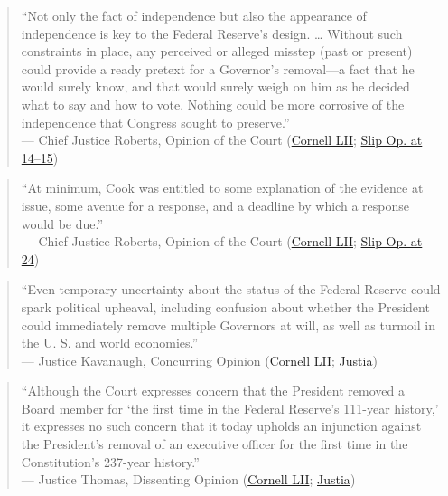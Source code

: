 \documentclass[12pt]{article}
\begin{document}
\begin{quote}
``Not only the fact of independence but also the appearance of independence is key to the Federal Reserve's design. \ldots{} Without such constraints in place, any perceived or alleged misstep (past or present) could provide a ready pretext for a Governor's removal---a fact that he would surely know, and that would surely weigh on him as he decided what to say and how to vote. Nothing could be more corrosive of the independence that Congress sought to preserve.'' \\
--- Chief Justice Roberts, Opinion of the Court (\href{https://www.law.cornell.edu/supremecourt/text/25A312}{Cornell LII}; \href{https://www.supremecourt.gov/opinions/25pdf/25a312_5468.pdf}{Slip Op. at 14--15})
\end{quote}

\begin{quote}
``At minimum, Cook was entitled to some explanation of the evidence at issue, some avenue for a response, and a deadline by which a response would be due.'' \\
--- Chief Justice Roberts, Opinion of the Court (\href{https://www.law.cornell.edu/supremecourt/text/25A312}{Cornell LII}; \href{https://www.supremecourt.gov/opinions/25pdf/25a312_5468.pdf}{Slip Op. at 24})
\end{quote}

\begin{quote}
``Even temporary uncertainty about the status of the Federal Reserve could spark political upheaval, including confusion about whether the President could immediately remove multiple Governors at will, as well as turmoil in the U. S. and world economies.'' \\
--- Justice Kavanaugh, Concurring Opinion (\href{https://www.law.cornell.edu/supremecourt/text/25A312}{Cornell LII}; \href{https://supreme.justia.com/cases/federal/us/609/25a312/}{Justia})
\end{quote}

\begin{quote}
``Although the Court expresses concern that the President removed a Board member for `the first time in the Federal Reserve's 111-year history,' it expresses no such concern that it today upholds an injunction against the President's removal of an executive officer for the first time in the Constitution's 237-year history.'' \\
--- Justice Thomas, Dissenting Opinion (\href{https://www.law.cornell.edu/supremecourt/text/25A312}{Cornell LII}; \href{https://supreme.justia.com/cases/federal/us/609/25a312/}{Justia})
\end{quote}
\end{document}

